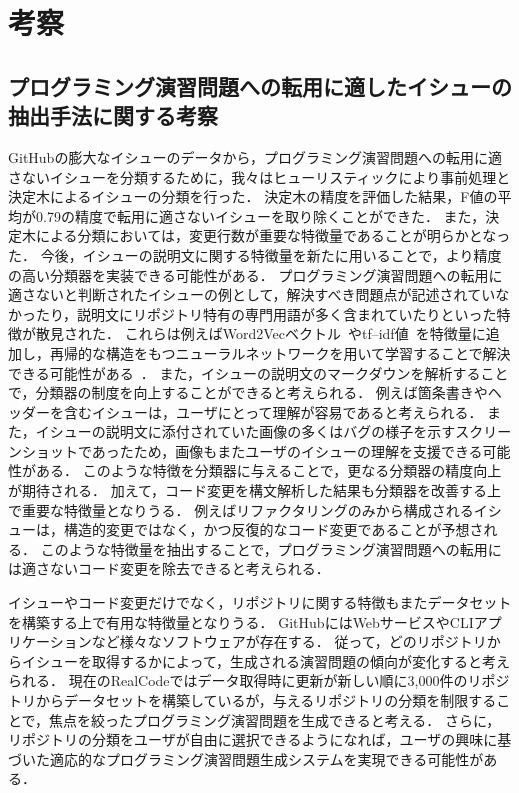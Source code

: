 \chapter{考察}
\graphicspath{{Chapter7/Figs/}}

\section{プログラミング演習問題への転用に適したイシューの抽出手法に関する考察}

GitHubの膨大なイシューのデータから，プログラミング演習問題への転用に適さないイシューを分類するために，我々はヒューリスティックにより事前処理と決定木によるイシューの分類を行った．
決定木の精度を評価した結果，F値の平均が0.79の精度で転用に適さないイシューを取り除くことができた．
また，決定木による分類においては，変更行数が重要な特徴量であることが明らかとなった．
今後，イシューの説明文に関する特徴量を新たに用いることで，より精度の高い分類器を実装できる可能性がある．
プログラミング演習問題への転用に適さないと判断されたイシューの例として，解決すべき問題点が記述されていなかったり，説明文にリポジトリ特有の専門用語が多く含まれていたりといった特徴が散見された．
これらは例えばWord2Vecベクトル~\cite{word2vec}やtf--idf値~\cite{TFIDF}を特徴量に追加し，再帰的な構造をもつニューラルネットワークを用いて学習することで解決できる可能性がある~\cite{RNN_clasification}．
また，イシューの説明文のマークダウンを解析することで，分類器の制度を向上することができると考えられる．
例えば箇条書きやヘッダーを含むイシューは，ユーザにとって理解が容易であると考えられる．
また，イシューの説明文に添付されていた画像の多くはバグの様子を示すスクリーンショットであったため，画像もまたユーザのイシューの理解を支援できる可能性がある．
このような特徴を分類器に与えることで，更なる分類器の精度向上が期待される．
加えて，コード変更を構文解析した結果も分類器を改善する上で重要な特徴量となりうる．
例えばリファクタリングのみから構成されるイシューは，構造的変更ではなく，かつ反復的なコード変更であることが予想される．
このような特徴量を抽出することで，プログラミング演習問題への転用には適さないコード変更を除去できると考えられる．

イシューやコード変更だけでなく，リポジトリに関する特徴もまたデータセットを構築する上で有用な特徴量となりうる．
GitHubにはWebサービスやCLIアプリケーションなど様々なソフトウェアが存在する．
従って，どのリポジトリからイシューを取得するかによって，生成される演習問題の傾向が変化すると考えられる．
現在のRealCodeではデータ取得時に更新が新しい順に3,000件のリポジトリからデータセットを構築しているが，与えるリポジトリの分類を制限することで，焦点を絞ったプログラミング演習問題を生成できると考える．
さらに，リポジトリの分類をユーザが自由に選択できるようになれば，ユーザの興味に基づいた適応的なプログラミング演習問題生成システムを実現できる可能性がある．




